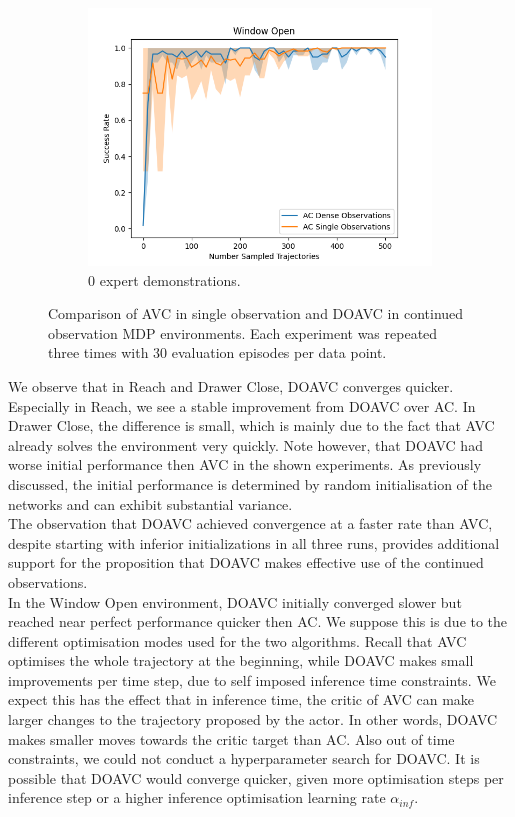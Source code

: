 \begin{figure}[htbp]
\begin{subfigure}[t]{0.32\textwidth}
    \includegraphics[width=\textwidth]{images/dense_vs_sparse_0/Window Open.png}
    \caption{0 expert demonstrations.}
  \end{subfigure}
  \caption{Comparison of AVC in single observation and DOAVC in continued observation MDP environments. Each experiment was repeated three times with 30 evaluation episodes per data point.
  }
  \label{fig:dense_vs_single}
\end{figure}

We observe that in Reach and Drawer Close, DOAVC converges quicker. Especially in Reach, we see a stable improvement from DOAVC over AC. In Drawer Close, the difference is 
small, which is mainly due to the fact that AVC already solves the environment very quickly. Note however, that DOAVC had worse initial performance then AVC in the shown experiments. 
As previously discussed, the initial performance is determined by random initialisation of the networks and can exhibit substantial 
variance.\\ 

The observation that DOAVC achieved convergence at a faster rate than AVC, despite starting with inferior initializations in 
all three runs, provides additional support for the proposition that DOAVC makes effective use of the continued observations. \\

In the Window Open environment, DOAVC initially converged slower but 
reached near perfect performance quicker then AC. We suppose this is due to the different optimisation modes used for the two algorithms. Recall that AVC optimises the whole 
trajectory at the beginning, while DOAVC makes small improvements per time step, due to self imposed inference time constraints. We expect this has the effect that in inference time, the critic of 
AVC can make larger changes to the trajectory proposed by the actor. In other words, DOAVC makes smaller moves towards the critic target than AC. Also out of time constraints, we could 
not conduct a hyperparameter search for DOAVC. It is possible that DOAVC would converge quicker, given more optimisation steps per inference step or a higher inference optimisation 
learning rate $\alpha_{inf}$.\\ 

